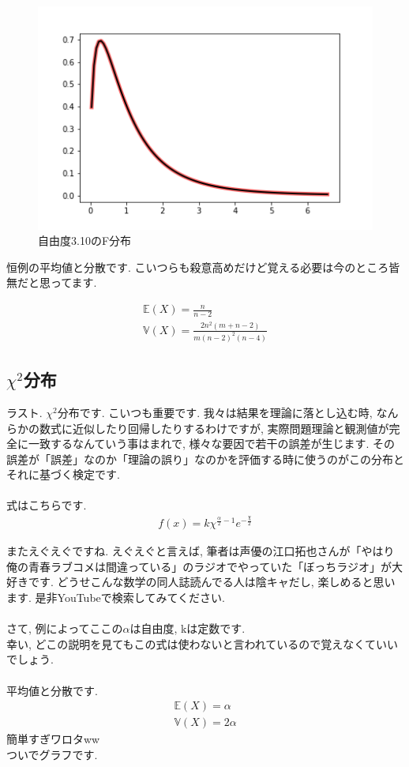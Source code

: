 \documentclass[11pt,a4paper]{jsarticle}                    %
\begin{document}
\begin{figure}[H]
\label{im:f_dist}
  \centering
  \includegraphics[width=120mm,bb=0 0 432 288]{../figures/f_dist.png}
  \caption{自由度3.10のF分布}
\end{figure}

恒例の平均値と分散です. こいつらも殺意高めだけど覚える必要は今のところ皆無だと思ってます.

\begin{eqnarray}
\mathbb{E}(X) = \frac{n}{n-2}\\
\mathbb{V}(X) = \frac{2n^2 (m+n-2)}{m(n-2)^2(n-4)}
\end{eqnarray}

\subsection{$\chi^2$分布}
ラスト. $\chi^2$分布です. こいつも重要です. 我々は結果を理論に落とし込む時, なんらかの数式に近似したり回帰したりするわけですが, 実際問題理論と観測値が完全に一致するなんていう事はまれで, 様々な要因で若干の誤差が生じます. その誤差が「誤差」なのか「理論の誤り」なのかを評価する時に使うのがこの分布とそれに基づく検定です. \\
\\
式はこちらです. 
\begin{eqnarray}
f(x) = k\chi^{\frac{\alpha}{2}-1}e^{-\frac{\chi}{2}}
\end{eqnarray}

またえぐえぐですね. えぐえぐと言えば, 筆者は声優の江口拓也さんが「やはり俺の青春ラブコメは間違っている」のラジオでやっていた「ぼっちラジオ」が大好きです. どうせこんな数学の同人誌読んでる人は陰キャだし, 楽しめると思います. 是非YouTubeで検索してみてください.\\
\\
さて, 例によってここの$\alpha$は自由度, kは定数です.\\
幸い, どこの説明を見てもこの式は使わないと言われているので覚えなくていいでしょう.\\
\\
平均値と分散です.
\begin{eqnarray}
\mathbb{E}(X) = \alpha \\
\mathbb{V}(X) = 2\alpha
\end{eqnarray}
簡単すぎワロタww\\
ついでグラフです.
\end{document}
